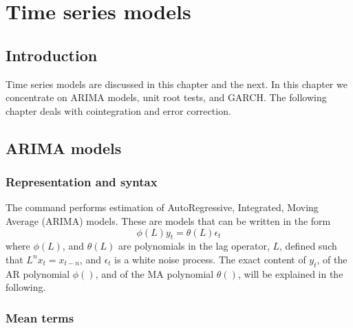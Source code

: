 \chapter{Time series models}
\label{chap:timeser}

\section{Introduction}
\label{sec:tsintro}

Time series models are discussed in this chapter and the next.  In
this chapter we concentrate on ARIMA models, unit root tests, and
GARCH.  The following chapter deals with cointegration and error
correction.

\section{ARIMA models}
\label{arma-estimation}

\subsection{Representation and syntax}
\label{arma-repr}

The  command performs estimation of AutoRegressive,
Integrated, Moving Average (ARIMA) models.  These are models that can
be written in the form
\begin{equation}
  \label{eq:plain-0-arma}
  \phi(L) y_t = \theta(L) \epsilon_t
\end{equation}
where $\phi(L)$, and $\theta(L)$ are polynomials in the lag operator,
$L$, defined such that $L^n x_t = x_{t-n}$, and $\epsilon_t$ is a
white noise process. The exact content of $y_t$, of the AR polynomial
$\phi()$, and of the MA polynomial $\theta()$, will be explained in the
following.

\subsection{Mean terms}
\label{sec:arma-nonzeromean}


